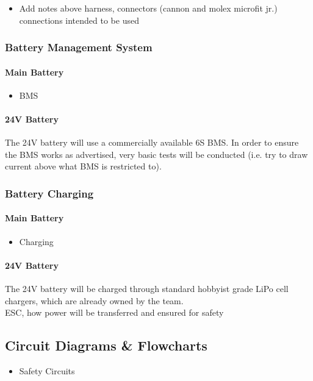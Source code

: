 \documentclass[main.tex]{subfile}
\begin{document}
    \begin{itemize}
        \item Add notes above harness, connectors (cannon and molex microfit jr.) connections intended to be used
    \end{itemize}

    \subsubsection{Battery Management System}
    \paragraph{Main Battery}
    \begin{itemize}
        \item BMS
    \end{itemize}

    \paragraph{24V Battery}
    The 24V battery will use a commercially available 6S BMS. In order to ensure the BMS works as advertised, very basic tests will be conducted (i.e. try to draw current above what BMS is restricted to).
    \subsubsection{Battery Charging}
    \paragraph{Main Battery}
    \begin{itemize}
        \item Charging
    \end{itemize}
    \paragraph{24V Battery}
    The 24V battery will be charged through standard hobbyist grade LiPo cell chargers, which are already owned by the team.\\

    ESC, how power will be transferred and ensured for safety

    \subsection{Circuit Diagrams \& Flowcharts}
    \begin{itemize}
        \item Safety Circuits
    \end{itemize}
\end{document}
